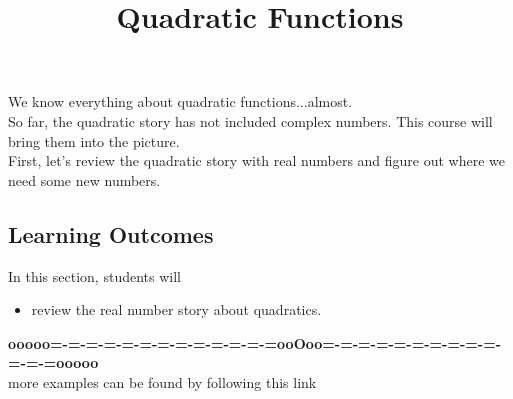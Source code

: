 \documentclass{ximera}
\title{Quadratic Functions}
\begin{document}
\begin{abstract}
\end{abstract}
\maketitle



We know everything about quadratic functions...almost. \\

So far, the quadratic story has not included complex numbers.  This course will bring them into the picture. \\



First, let's review the quadratic story with real numbers and figure out where we need some new numbers.













\subsection{Learning Outcomes}

\begin{sectionOutcomes}
In this section, students will 

\begin{itemize}
\item review the real number story about quadratics.
\end{itemize}
\end{sectionOutcomes}










\begin{center}
\textbf{\textcolor{green!50!black}{ooooo=-=-=-=-=-=-=-=-=-=-=-=-=ooOoo=-=-=-=-=-=-=-=-=-=-=-=-=ooooo}} \\

more examples can be found by following this link\\ 

\end{center}
\end{document}
